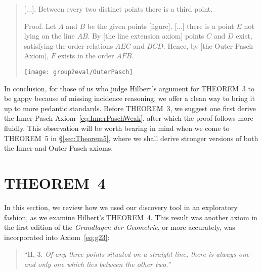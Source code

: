 \begin{quotation}\label{sec:VeblenThree}
[...]. Between every two distinct points there is a third point.

Proof. Let $A$ and $B$ be the given points [figure]. [...] there is a point $E$ not lying on the line $AB$. By [the line extension axiom] points $C$ and $D$ exist, satisfying the order-relations $AEC$ and $BCD$. Hence, by [the Outer Pasch Axiom], $F$ exists in the order $AFB$.
\vspace{0.5cm}

\centering\texttt{[image: group2eval/OuterPasch]}
\end{quotation}
In conclusion, for those of us who judge Hilbert's argument for THEOREM~3 to be gappy because of missing incidence reasoning, we offer a clean way to bring it up to more pedantic standards. Before THEOREM~3, we suggest one first derive the Inner Pasch Axiom~\eqref{eq:InnerPaschWeak}, after which the proof follows more fluidly. This observation will be worth bearing in mind when we come to THEOREM~5 in \S\ref{sec:Theorem5}, where we shall derive stronger versions of both the Inner and Outer Pasch axioms.

\section{THEOREM~4}
In this section, we review how we used our discovery tool in an exploratory fashion, as we examine Hilbert's THEOREM~4. This result was another axiom in the first edition of the \emph{Grundlagen der Geometrie}, or more accurately, was incorporated into Axiom~\ref{eq:g23}:
\begin{quotation}
  ``II, 3. \emph{Of any three points situated on a straight line, there is always one and only one which lies between the other two.''}
\end{quotation}

